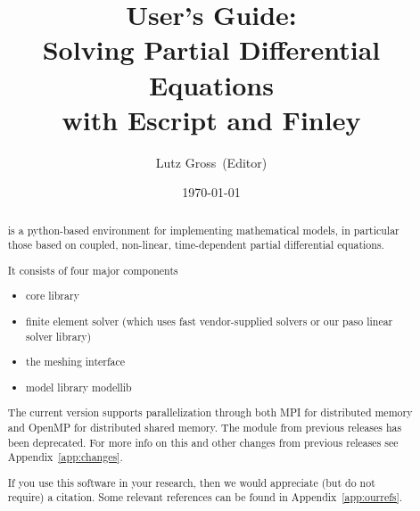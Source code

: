 \documentclass{manual}
\title{\module{esys} User's Guide:\\ Solving Partial Differential Equations\\ with Escript and Finley}
\author{Lutz Gross\etal~(Editor)}
\date{\today}
\begin{document}
\maketitle



\begin{abstract}
\escript is a python-based environment for implementing mathematical models, in particular those based on coupled, non-linear, time-dependent partial differential equations.

It consists of four major components
\begin{itemize}
\item \escript core library
\item finite element solver \finley (which uses fast vendor-supplied solvers or our paso linear solver library)
\item the meshing interface \pycad
\item model library modellib
\end{itemize}
The current version supports parallelization through both MPI for distributed memory and OpenMP for distributed shared memory. 
The \pyvisi module from previous releases has been deprecated.
For more info on this and other changes from previous releases see Appendix~\ref{app:changes}.

If you use this software in your research, then we would appreciate (but do not require) a citation.
Some relevant references can be found in Appendix~\ref{app:ourrefs}.
\end{abstract}

\tableofcontents














\appendix

%





\makemodindex

\printindex
%



\end{document}
